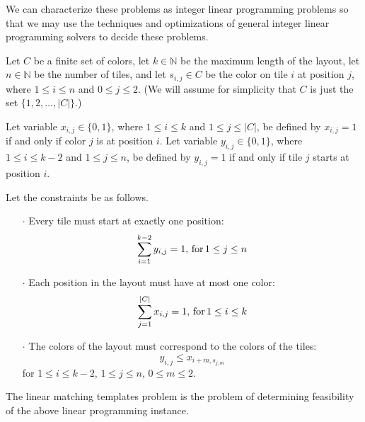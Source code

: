 We can characterize these problems as integer linear programming problems so
that we may use the techniques and optimizations of general integer linear
programming solvers to decide these problems.

\begin{shaded}
\begin{definition}\mbox{}

  Let $C$ be a finite set of colors, let $k\in\mathbb{N}$ be the maximum
  length of the layout, let $n\in\mathbb{N}$ be the number of tiles, and let
  $s_{i,j}\in C$ be the color on tile $i$ at position $j$, where $1\leq i\leq
  n$ and $0\leq j\leq 2$. (We will assume for simplicity that $C$ is just the
  set $\{1, 2,\ldots, |C|\}$.)

  Let variable $x_{i,j}\in\{0, 1\}$, where $1\leq i\leq k$ and $1\leq j\leq
  |C|$, be defined by $x_{i, j} = 1$ if and only if color $j$ is at position
  $i$. Let variable $y_{i,j}\in\{0, 1\}$, where $1\leq i\leq k-2$ and $1\leq
  j\leq n$, be defined by $y_{i, j} = 1$ if and only if tile $j$ starts at
  position $i$.
    
  Let the constraints be as follows.
  \begin{itemize}
  \item[$\cdot$] Every tile must start at exactly one position:
    \begin{displaymath}
      \sum_{i = 1}^{k - 2}{y_{i, j}} = 1,\,\textnormal{for}\, 1\leq j\leq n
    \end{displaymath}
  \item[$\cdot$] Each position in the layout must have at most one color:
    \begin{displaymath}
      \sum_{j = 1}^{|C|}{x_{i, j}} = 1,\,\textnormal{for}\, 1\leq i\leq k
    \end{displaymath}
  \item[$\cdot$] The colors of the layout must correspond to the colors of
    the tiles:
    \begin{displaymath}
      y_{i, j} \leq x_{i + m, s_{j, m}}
    \end{displaymath}
    for $1\leq i\leq k - 2$, $1\leq j\leq n$, $0\leq m\leq 2$.
  \end{itemize}
    
  The linear matching templates problem is the problem of determining
  feasibility of the above linear programming instance.
\end{definition}
\end{shaded}
